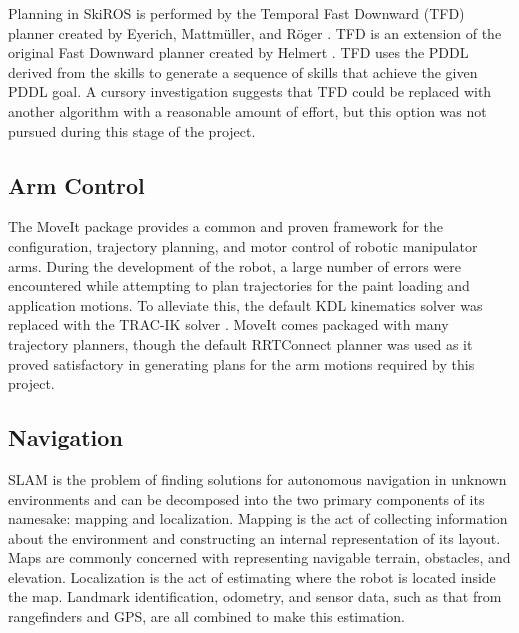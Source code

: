 Planning in SkiROS is performed by the Temporal Fast Downward (TFD) planner created by Eyerich, Mattm{\"u}ller, and R{\"o}ger \cite{eyerich2009using}. TFD is an extension of the original Fast Downward planner created by Helmert \cite{helmert2006fast}. TFD uses the PDDL derived from the skills to generate a sequence of skills that achieve the given PDDL goal. A cursory investigation suggests that TFD could be replaced with another algorithm with a reasonable amount of effort, but this option was not pursued during this stage of the project.

\subsection{Arm Control}
The MoveIt package provides a common and proven framework for the configuration, trajectory planning, and motor control of robotic manipulator arms. During the development of the robot, a large number of errors were encountered while attempting to plan trajectories for the paint loading and application motions. To alleviate this, the default KDL kinematics solver was replaced with the TRAC-IK solver \cite{trac_ik}. MoveIt comes packaged with many trajectory planners, though the default RRTConnect planner \cite{kuffner2000rrt} was used as it proved satisfactory in generating plans for the arm motions required by this project.

\subsection{Navigation}
SLAM is the problem of finding solutions for autonomous navigation in unknown environments and can be decomposed into the two primary components of its namesake: mapping and localization. Mapping is the act of collecting information about the environment and constructing an internal representation of its layout. Maps are commonly concerned with representing navigable terrain, obstacles, and elevation. Localization is the act of estimating where the robot is located inside the map. Landmark identification, odometry, and sensor data, such as that from rangefinders and GPS, are all combined to make this estimation.

